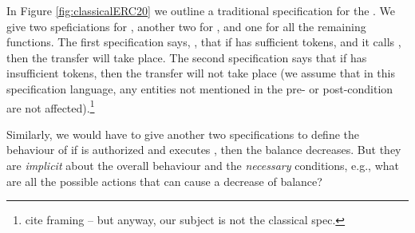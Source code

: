In Figure \ref{fig:classicalERC20} we outline a traditional specification for the .
We give two speficiations for , another two for , and one for all 
the remaining functions. The  first specification says, \eg, that if  
  has sufficient tokens, and it calls , then the transfer will take place.  
The second specification says that  if  has insufficient tokens, then 
the transfer will not take place (we assume that in this
specification language, any entities not mentioned in the pre- or post-condition 
are not affected).\footnote{cite framing -- but anyway, our subject is
not the classical spec.} 
 
 Similarly, we would have to give another two specifications to define the behaviour of 
if  is authorized and executes , then   the balance decreases. 
But they are {\em implicit} about the overall behaviour and the   {\em necessary} conditions,
e.g., what are all the possible actions that can cause a decrease of balance?


